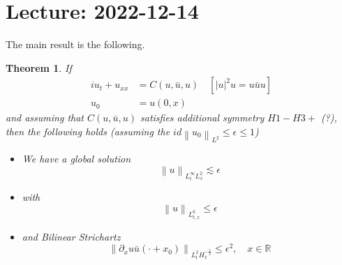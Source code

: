 \documentclass{article}
\newtheorem{theorem}{Theorem}
\def\R{\mathbb{R}} %
\newcommand\norm[1]{\left\lVert#1\right\rVert}
\begin{document}
\section{Lecture: 2022-12-14}

The main result is the following.
\begin{theorem}
  If
  \begin{align*}
    iu_{t}+u_{xx}&=C(u,\bar{u},u) \quad [|u|^{2}u = u\bar{u}u]\\
    u_{0}&=u(0,x)
  \end{align*}
  and assuming that $C(u,\bar{u},u)$ satisfies additional symmetry $H1-H3+$ (?),
  then the following holds (assuming the
  $id\norm{u_{0}}_{L^{2}}\leq \epsilon \leq 1$)
  \begin{itemize}
    \item We have a global solution
    \begin{equation*}
      \norm{u}_{L^{\infty}_{t}L_{x}^{2}}\lesssim \epsilon
    \end{equation*}
    \item with
    \begin{equation*}
      \norm{u}_{L^{6}_{t,x}}\leq \epsilon
    \end{equation*}
    \item and Bilinear Strichartz
    \begin{equation*}
      \norm{\partial_{x}u\bar{u}(\cdot + x_{0})}_{L_{t}^{2}H_{x}^{-\frac{1}{2}}} 
      \leq \epsilon^{2}, \quad x\in \R
    \end{equation*}
  \end{itemize}
\end{theorem}
\end{document}
